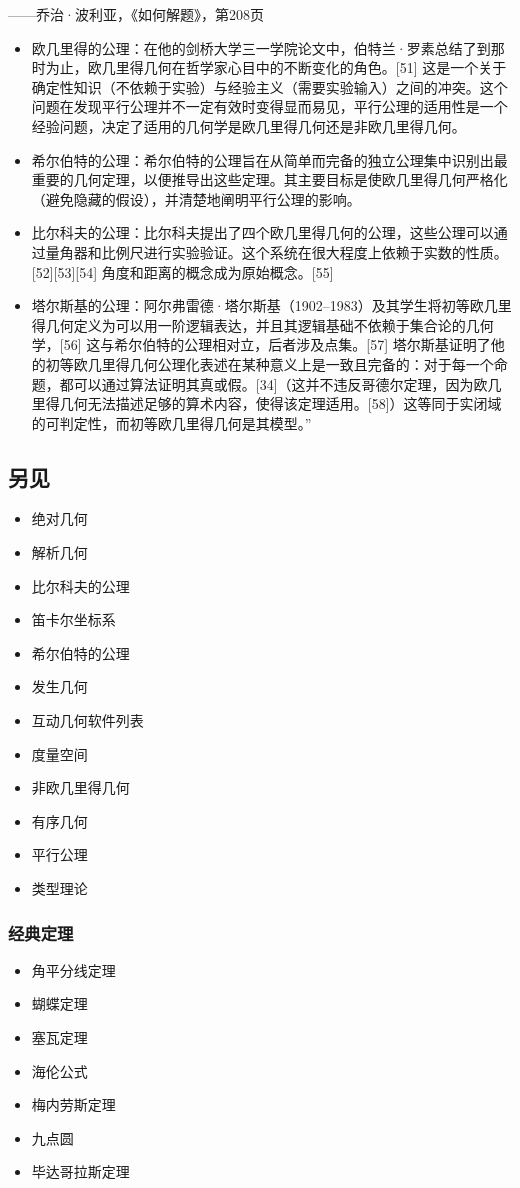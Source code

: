 ——乔治·波利亚，《如何解题》，第208页
\begin{itemize}
\item 欧几里得的公理：在他的剑桥大学三一学院论文中，伯特兰·罗素总结了到那时为止，欧几里得几何在哲学家心目中的不断变化的角色。[51] 这是一个关于确定性知识（不依赖于实验）与经验主义（需要实验输入）之间的冲突。这个问题在发现平行公理并不一定有效时变得显而易见，平行公理的适用性是一个经验问题，决定了适用的几何学是欧几里得几何还是非欧几里得几何。  
\item 希尔伯特的公理：希尔伯特的公理旨在从简单而完备的独立公理集中识别出最重要的几何定理，以便推导出这些定理。其主要目标是使欧几里得几何严格化（避免隐藏的假设），并清楚地阐明平行公理的影响。
\item 比尔科夫的公理：比尔科夫提出了四个欧几里得几何的公理，这些公理可以通过量角器和比例尺进行实验验证。这个系统在很大程度上依赖于实数的性质。[52][53][54] 角度和距离的概念成为原始概念。[55]
\item 塔尔斯基的公理：阿尔弗雷德·塔尔斯基（1902–1983）及其学生将初等欧几里得几何定义为可以用一阶逻辑表达，并且其逻辑基础不依赖于集合论的几何学，[56] 这与希尔伯特的公理相对立，后者涉及点集。[57] 塔尔斯基证明了他的初等欧几里得几何公理化表述在某种意义上是一致且完备的：对于每一个命题，都可以通过算法证明其真或假。[34]（这并不违反哥德尔定理，因为欧几里得几何无法描述足够的算术内容，使得该定理适用。[58]）这等同于实闭域的可判定性，而初等欧几里得几何是其模型。”
\end{itemize}
\subsection{另见}  
\begin{itemize}
\item 绝对几何  
\item 解析几何  
\item 比尔科夫的公理  
\item 笛卡尔坐标系  
\item 希尔伯特的公理  
\item 发生几何  
\item 互动几何软件列表  
\item 度量空间  
\item 非欧几里得几何  
\item 有序几何  
\item 平行公理  
\item 类型理论
\end{itemize}
\subsubsection{经典定理}  
\begin{itemize}
\item 角平分线定理  
\item 蝴蝶定理  
\item 塞瓦定理  
\item 海伦公式  
\item 梅内劳斯定理  
\item 九点圆  
\item 毕达哥拉斯定理
\end{itemize}
